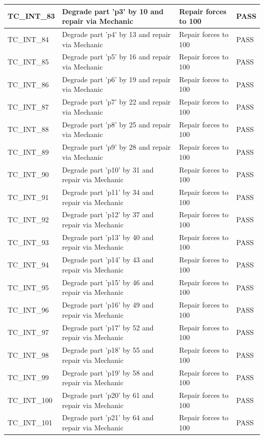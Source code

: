 \documentclass{article}
\begin{document}
\begin{longtable}{|p{2cm}|p{8cm}|p{3cm}|p{2cm}|}
\hline
TC\_INT\_83 & Degrade part 'p3' by 10 and repair via Mechanic & Repair forces to 100 & PASS \\
\hline
TC\_INT\_84 & Degrade part 'p4' by 13 and repair via Mechanic & Repair forces to 100 & PASS \\
\hline
TC\_INT\_85 & Degrade part 'p5' by 16 and repair via Mechanic & Repair forces to 100 & PASS \\
\hline
TC\_INT\_86 & Degrade part 'p6' by 19 and repair via Mechanic & Repair forces to 100 & PASS \\
\hline
TC\_INT\_87 & Degrade part 'p7' by 22 and repair via Mechanic & Repair forces to 100 & PASS \\
\hline
TC\_INT\_88 & Degrade part 'p8' by 25 and repair via Mechanic & Repair forces to 100 & PASS \\
\hline
TC\_INT\_89 & Degrade part 'p9' by 28 and repair via Mechanic & Repair forces to 100 & PASS \\
\hline
TC\_INT\_90 & Degrade part 'p10' by 31 and repair via Mechanic & Repair forces to 100 & PASS \\
\hline
TC\_INT\_91 & Degrade part 'p11' by 34 and repair via Mechanic & Repair forces to 100 & PASS \\
\hline
TC\_INT\_92 & Degrade part 'p12' by 37 and repair via Mechanic & Repair forces to 100 & PASS \\
\hline
TC\_INT\_93 & Degrade part 'p13' by 40 and repair via Mechanic & Repair forces to 100 & PASS \\
\hline
TC\_INT\_94 & Degrade part 'p14' by 43 and repair via Mechanic & Repair forces to 100 & PASS \\
\hline
TC\_INT\_95 & Degrade part 'p15' by 46 and repair via Mechanic & Repair forces to 100 & PASS \\
\hline
TC\_INT\_96 & Degrade part 'p16' by 49 and repair via Mechanic & Repair forces to 100 & PASS \\
\hline
TC\_INT\_97 & Degrade part 'p17' by 52 and repair via Mechanic & Repair forces to 100 & PASS \\
\hline
TC\_INT\_98 & Degrade part 'p18' by 55 and repair via Mechanic & Repair forces to 100 & PASS \\
\hline
TC\_INT\_99 & Degrade part 'p19' by 58 and repair via Mechanic & Repair forces to 100 & PASS \\
\hline
TC\_INT\_100 & Degrade part 'p20' by 61 and repair via Mechanic & Repair forces to 100 & PASS \\
\hline
TC\_INT\_101 & Degrade part 'p21' by 64 and repair via Mechanic & Repair forces to 100 & PASS \\

\end{longtable}
\end{document}

